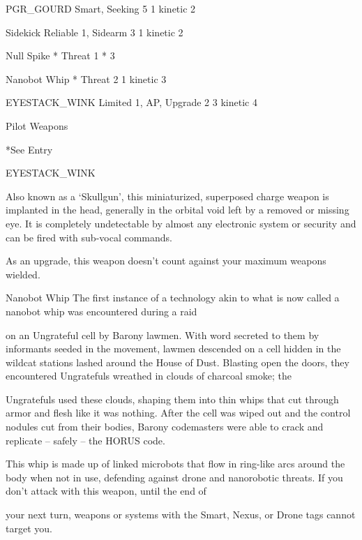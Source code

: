  PGR\_GOURD              Smart, Seeking                         5               1 kinetic              2 

 Sidekick               Reliable 1, Sidearm                    3               1 kinetic              2 

 Null Spike             *                                     Threat 1        *                       3 

 Nanobot Whip           *                                     Threat 2         1 kinetic              3 

 EYESTACK\_WINK          Limited 1, AP, Upgrade                 2              3 kinetic               4 

                                                Pilot Weapons  

*See Entry
 

EYESTACK\_WINK  

Also known as a ‘Skullgun’, this miniaturized, superposed charge weapon is implanted in the head,  
generally in the orbital void left by a removed or missing eye. It is completely undetectable by almost any  
electronic system or security and can be fired with sub-vocal commands.   

As an upgrade, this weapon doesn’t count against your maximum weapons wielded.
 

Nanobot Whip  
The first instance of a technology akin to what is now called a nanobot whip was encountered during a raid  

on an Ungrateful cell by Barony lawmen. With word secreted to them by informants seeded in the  
movement, lawmen descended on a cell hidden in the wildcat stations lashed around the House of Dust.  
Blasting open the doors, they encountered Ungratefuls wreathed in clouds of charcoal smoke; the  

Ungratefuls used these clouds, shaping them into thin whips that cut through armor and flesh like it was  
nothing. After the cell was wiped out and the control nodules cut from their bodies, Barony codemasters  
were able to crack and replicate -- safely -- the HORUS code.   

This whip is made up of linked microbots that flow in ring-like arcs around the body when not in use,  
defending against drone and nanorobotic threats. If you don’t attack with this weapon, until the end of  

your next turn, weapons or systems with the Smart, Nexus, or Drone tags cannot target you.
 

